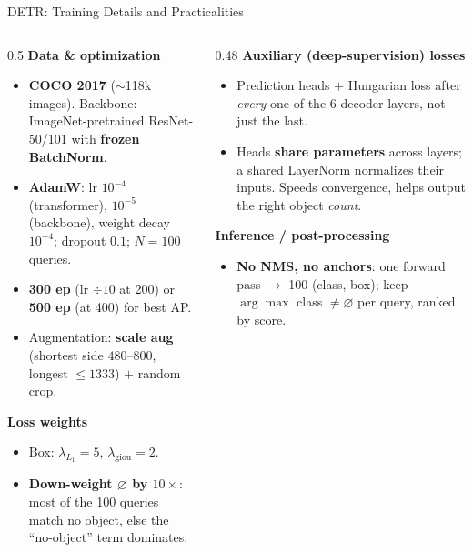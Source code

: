 \begin{frame}{DETR: Training Details and Practicalities}

  \begin{columns}[T]
    \begin{column}{0.5\textwidth}
      \textbf{Data \& optimization}
      \begin{itemize}
        \item \textbf{COCO 2017} ($\sim$118k images). Backbone: ImageNet-pretrained ResNet-50/101 with \textbf{frozen BatchNorm}.
        \item \textbf{AdamW}: lr $10^{-4}$ (transformer), $10^{-5}$ (backbone), weight decay $10^{-4}$; dropout $0.1$; $N{=}100$ queries.
        \item \textbf{300 ep} (lr ${\div}10$ at 200) or \textbf{500 ep} (at 400) for best AP.
        \item Augmentation: \textbf{scale aug} (shortest side $480$--$800$, longest $\le 1333$) $+$ random crop.
      \end{itemize}

      \vspace{0.2em}
      \textbf{Loss weights}
      \begin{itemize}
        \item Box: $\lambda_{L_1}{=}5$, $\lambda_\text{giou}{=}2$.
        \item \textbf{Down-weight $\varnothing$ by $10\times$}: most of the 100 queries match no object, else the ``no-object'' term dominates.
      \end{itemize}
    \end{column}
    \begin{column}{0.48\textwidth}
      \textbf{Auxiliary (deep-supervision) losses}
      \begin{itemize}
        \item Prediction heads $+$ Hungarian loss after \emph{every} one of the 6 decoder layers, not just the last.
        \item Heads \textbf{share parameters} across layers; a shared LayerNorm normalizes their inputs. Speeds convergence, helps output the right object \emph{count}.
      \end{itemize}

      \vspace{0.2em}
      \textbf{Inference / post-processing}
      \begin{itemize}
        \item \textbf{No NMS, no anchors}: one forward pass $\to$ 100 (class, box); keep $\arg\max$ class $\neq\varnothing$ per query, ranked by score.
      \end{itemize}


\end{column}
\end{columns}
\end{frame}
